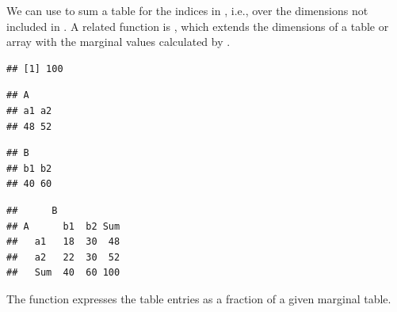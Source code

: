 \documentclass[11pt]{book}
\renewenvironment{knitrout}{\small\renewcommand{\baselinestretch}{.85}}{} %
\begin{document}
We can use  to sum a table  for
the indices in , i.e., over the dimensions not included
in .
A related function is ,
which extends the dimensions of a table or array with the marginal values calculated
by .

\begin{knitrout}
\color{fgcolor}\begin{kframe}
\begin{alltt}
      
\end{alltt}
\begin{verbatim}
## [1] 100
\end{verbatim}
\begin{alltt}
 \hlstd{)}   
\end{alltt}
\begin{verbatim}
## A
## a1 a2 
## 48 52
\end{verbatim}
\begin{alltt}
 \hlstd{)}   
\end{alltt}
\begin{verbatim}
## B
## b1 b2 
## 40 60
\end{verbatim}
\begin{alltt}
        
\end{alltt}
\begin{verbatim}
##      B
## A      b1  b2 Sum
##   a1   18  30  48
##   a2   22  30  52
##   Sum  40  60 100
\end{verbatim}
\end{kframe}
\end{knitrout}
The function  expresses the table entries as a fraction of
a given marginal table.  
\end{document}
